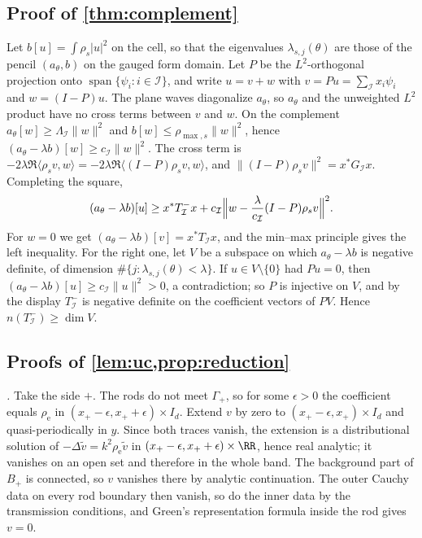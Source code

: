 \subsection{Proof of \texorpdfstring{\cref{thm:complement}}{Theorem 2.6}}\label{sm:proof-complement}
Let $b[u]=\int\rho_s|u|^2$ on the cell, so that the eigenvalues
$\lambda_{s,j}(\theta)$ are those of the pencil $(a_\theta,b)$ on the gauged form
domain. Let $P$ be the $L^2$-orthogonal projection onto
$\operatorname{span}\{\psi_i:i\in\mathcal I\}$, and write $u=v+w$ with
$v=Pu=\sum_{\mathcal I}x_i\psi_i$ and $w=(I-P)u$. The plane waves diagonalize
$a_\theta$, so $a_\theta$ and the unweighted $L^2$ product have no cross terms
between $v$ and $w$. On the complement $a_\theta[w]\ge\Lambda_{\mathcal I}\|w\|^2$
and $b[w]\le\rho_{\max,s}\|w\|^2$, hence $(a_\theta-\lambda b)[w]\ge
c_{\mathcal I}\|w\|^2$. The cross term is
$-2\lambda\Re\langle\rho_sv,w\rangle=-2\lambda\Re\langle(I-P)\rho_sv,w\rangle$, and
$\|(I-P)\rho_sv\|^2=x^*G_{\mathcal I}x$. Completing the square,
\[
  (a_\theta-\lambda b)[u]\ge x^*T^-_{\mathcal I}x
  +c_{\mathcal I}\Bigl\|w-\frac{\lambda}{c_{\mathcal I}}(I-P)\rho_sv\Bigr\|^2 .
\]
For $w=0$ we get $(a_\theta-\lambda b)[v]=x^*T_{\mathcal I}x$, and the min--max
principle gives the left inequality. For the right one, let $V$ be a subspace on
which $a_\theta-\lambda b$ is negative definite, of dimension
$\#\{j:\lambda_{s,j}(\theta)<\lambda\}$. If $u\in V\setminus\{0\}$ had $Pu=0$, then
$(a_\theta-\lambda b)[u]\ge c_{\mathcal I}\|u\|^2>0$, a contradiction; so $P$ is
injective on $V$, and by the display $T^-_{\mathcal I}$ is negative definite on
the coefficient vectors of $PV$. Hence $n(T^-_{\mathcal I})\ge\dim V$.

\subsection{Proofs of \texorpdfstring{\cref{lem:uc,prop:reduction}}{Lemma 3.1 and Proposition 3.2}}\label{sm:proof-reduction}
\emph{.} Take the side $+$. The rods do not meet $\Gamma_+$, so for
some $\epsilon>0$ the coefficient equals $\rho_{\mathrm e}$ in
$(x_+-\epsilon,x_++\epsilon)\times I_d$. Extend $v$ by zero to
$(x_+-\epsilon,x_+)\times I_d$ and quasi-periodically in $y$. Since both traces
vanish, the extension is a distributional solution of
$-\Delta\tilde v=k^2\rho_{\mathrm e}\tilde v$ in
$(x_+-\epsilon,x_++\epsilon)\times\RR$, hence real analytic; it vanishes on an
open set and therefore in the whole band. The background part of $B_+$ is
connected, so $v$ vanishes there by analytic continuation. The outer Cauchy
data on every rod boundary then vanish, so do the inner data by the
transmission conditions, and Green's representation formula inside the rod
gives $v=0$.

